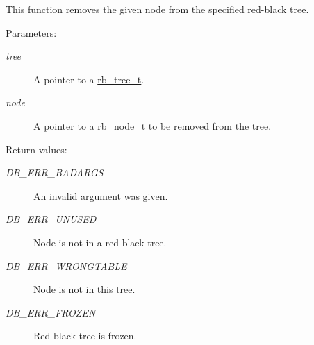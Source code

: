 This function removes the given node from the specified red-black tree.\begin{Desc}
\item[Parameters: ]\par
\begin{description}
\item[{\em 
tree}]A pointer to a \hyperlink{group__dbprim__rbtree_a0}{rb\_\-tree\_\-t}. \item[{\em 
node}]A pointer to a \hyperlink{group__dbprim__rbtree_a1}{rb\_\-node\_\-t} to be removed from the tree.\end{description}
\end{Desc}
\begin{Desc}
\item[Return values: ]\par
\begin{description}
\item[{\em 
DB\_\-ERR\_\-BADARGS}]An invalid argument was given. \item[{\em 
DB\_\-ERR\_\-UNUSED}]Node is not in a red-black tree. \item[{\em 
DB\_\-ERR\_\-WRONGTABLE}]Node is not in this tree. \item[{\em 
DB\_\-ERR\_\-FROZEN}]Red-black tree is frozen. \end{description}
\end{Desc}
